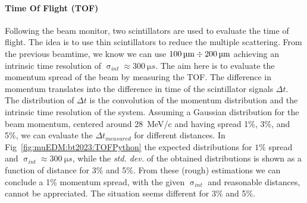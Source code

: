 \begin{refsection}
        \paragraph{Time Of Flight (TOF)}
        Following the beam monitor, two scintillators are used to evaluate the time of flight.
        The idea is to use thin scintillators to reduce the multiple scattering.
        From the previous beamtime, we know we can use $\SI{100}{\micro m}\divisionsymbol\SI{200}{\micro m}$ achieving an intrinsic time resolution of $\upsigma_{int}\approx\SI{300}{\micro s}$.
        The aim here is to evaluate the momentum spread of the beam by measuring the TOF.
        The difference in momentum translates into the difference in time of the scintillator signals $\Delta t$. 
        The distribution of $\Delta t$ is the convolution of the momentum distribution and the intrinsic time resolution of the system.
        Assuming a Gaussian distribution for the beam momentum, centered around \SI{28}{MeV/c} and having spread 1\%, 3\%, and 5\%, we can evaluate the $\Delta t_{measured}$ for different distances.
        In Fig~\ref{fig:muEDM:bt2023:TOFPython} the expected distributions for $1\%$ spread and $\upsigma_{int}\approx\SI{300}{\micro s}$, while the \textit{std. dev.} of the obtained distributions is shown as a function of distance for 3\% and 5\%.
        From these (rough) estimations we can conclude a 1\% momentum spread, with the given $\upsigma_{int}$ and reasonable distances, cannot be appreciated. 
        The situation seems different for 3\% and 5\%.
        

\end{refsection}
